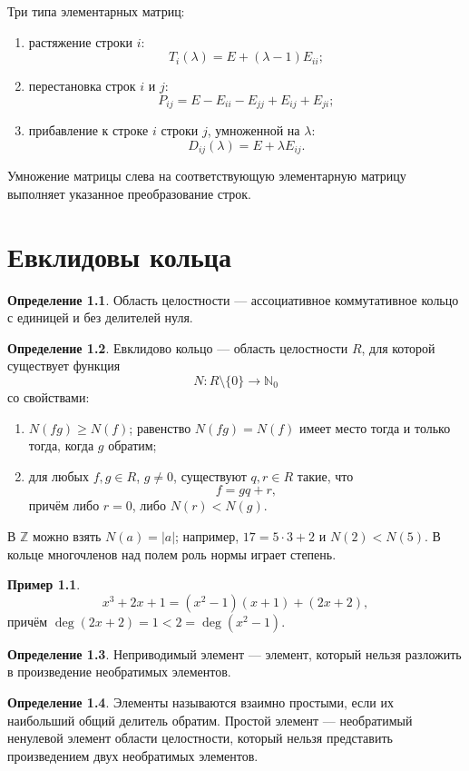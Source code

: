 \documentclass[12pt,a4paper,oneside,openany]{book}
\theoremstyle{definition}
\newtheorem{definition}{Определение}[chapter]
\newtheorem{example}{Пример}[chapter]
\theoremstyle{plain}
\theoremstyle{remark}
\newcommand{\N}{\mathbb{N}}
\newcommand{\Z}{\mathbb{Z}}
\begin{document}
Три типа элементарных матриц:
\begin{enumerate}[label=\arabic*)]
  \item растяжение строки $i$:
  \[
    T_i(\lambda)=E+(\lambda-1)E_{ii};
  \]
  \item перестановка строк $i$ и $j$:
  \[
    P_{ij}=E-E_{ii}-E_{jj}+E_{ij}+E_{ji};
  \]
  \item прибавление к строке $i$ строки $j$, умноженной на $\lambda$:
  \[
    D_{ij}(\lambda)=E+\lambda E_{ij}.
  \]
\end{enumerate}
Умножение матрицы слева на соответствующую элементарную матрицу выполняет
указанное преобразование строк.


\chapter{Евклидовы кольца}

\begin{definition}
Область целостности --- ассоциативное коммутативное кольцо с единицей и
без делителей нуля.
\end{definition}

\begin{definition}
Евклидово кольцо --- область целостности $R$, для которой существует
функция
\[
  N\colon R\setminus\{0\}\to\N_0
\]
со свойствами:
\begin{enumerate}[label=\arabic*)]
  \item $N(fg)\geq N(f)$; равенство $N(fg)=N(f)$ имеет место тогда и
  только тогда, когда $g$ обратим;
  \item для любых $f,g\in R$, $g\ne0$, существуют $q,r\in R$ такие, что
  \[
    f=gq+r,
  \]
  причём либо $r=0$, либо $N(r)<N(g)$.
\end{enumerate}
\end{definition}

В $\Z$ можно взять $N(a)=|a|$; например,
$17=5\cdot3+2$ и $N(2)<N(5)$. В кольце многочленов над полем роль нормы
играет степень.

\begin{example}
\[
  x^3+2x+1=(x^2-1)(x+1)+(2x+2),
\]
причём $\deg(2x+2)=1<2=\deg(x^2-1)$.
\end{example}

\begin{definition}
Неприводимый элемент --- элемент, который нельзя разложить в произведение
необратимых элементов.
\end{definition}

\begin{definition}
Элементы называются взаимно простыми, если их наибольший общий делитель
обратим. Простой элемент --- необратимый ненулевой элемент области
целостности, который нельзя представить произведением двух необратимых
элементов.
\end{definition}
\end{document}
